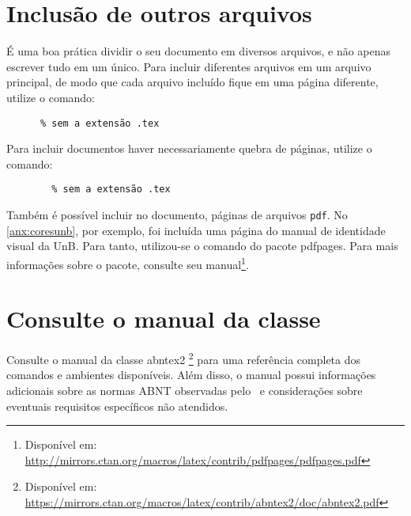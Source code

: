 \section{Inclusão de outros arquivos}\label{sec:include}

É uma boa prática dividir o seu documento em diversos arquivos, e não apenas escrever tudo em um único. Para incluir diferentes arquivos em um arquivo principal, de modo que cada arquivo incluído fique em uma página diferente, utilize o comando:
\begin{verbatim}
      % sem a extensão .tex
\end{verbatim}

Para incluir documentos haver necessariamente quebra de páginas, utilize o comando:
\begin{verbatim}
        % sem a extensão .tex
\end{verbatim}

Também é possível incluir no documento, páginas de arquivos \texttt{pdf}. No \cref{anx:coresunb}, por exemplo, foi incluída uma página do manual de identidade visual da UnB. Para tanto, utilizou-se o comando \verb|| do pacote \textsf{pdfpages}. Para mais informações sobre o pacote, consulte seu manual\footnote{Disponível em: \url{http://mirrors.ctan.org/macros/latex/contrib/pdfpages/pdfpages.pdf}}.

\section{Consulte o manual da classe \abnTeX}

Consulte o manual da classe \textsf{abntex2} \cite{abntex2classe}\footnote{Disponível em: \url{https://mirrors.ctan.org/macros/latex/contrib/abntex2/doc/abntex2.pdf}} para uma referência completa dos comandos e ambientes disponíveis. Além disso, o manual possui informações adicionais sobre as normas ABNT observadas pelo \abnTeX\ e considerações sobre eventuais requisitos específicos não atendidos.